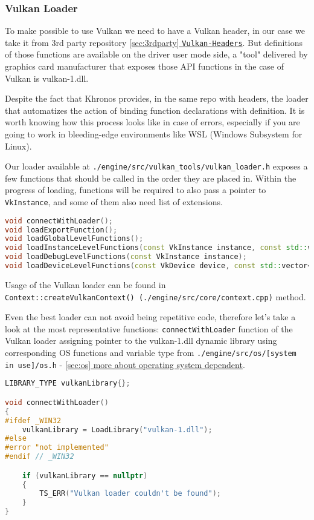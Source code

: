 \newpage
\subsubsection{Vulkan Loader}
\label{sec:vkLoader}
\hspace{\parindent}
To make possible to use Vulkan we need to have a Vulkan header, in our case we take it from 3rd party repository  \hyperref[sec:3rdparty]{\ref*{sec:3rdparty} \texttt{Vulkan-Headers}}. But definitions of those functions are available on the driver user mode side, a "tool" delivered by graphics card manufacturer that exposes those API functions in the case of Vulkan is vulkan-1.dll.

Despite the fact that Khronos provides, in the same repo with headers, the loader that automatizes the action of binding function declarations with definition. It is worth knowing how this process looks like in case of errors, especially if you are going to work in bleeding-edge environments like WSL (Windows Subsystem for Linux).

Our loader available at \texttt{./engine/src/vulkan\_tools/vulkan\_loader.h} exposes a few functions that should be called in the order they are placed in. Within the progress of loading, functions will be required to also pass a pointer to \texttt{VkInstance}, and some of them also need list of extensions.
\begin{lstlisting}[language=c++, caption=Vulkan loader header (./engine/src/vulkan\_tools/vulkan\_loader.h)]
void connectWithLoader();
void loadExportFunction();
void loadGlobalLevelFunctions();
void loadInstanceLevelFunctions(const VkInstance instance, const std::vector<std::string>& vulkanInstanceExtensions);
void loadDebugLevelFunctions(const VkInstance instance);
void loadDeviceLevelFunctions(const VkDevice device, const std::vector<std::string>& enabledVulkanDeviceExtensions);
\end{lstlisting}

Usage of the Vulkan loader can be found in \\
\texttt{Context::createVulkanContext() (./engine/src/core/context.cpp)} method.

Even the best loader can not avoid being repetitive code, therefore let's take a look at the most representative functions:
\texttt{connectWithLoader} function of the Vulkan loader assigning pointer to the vulkan-1.dll dynamic library using corresponding OS functions and variable type from \texttt{./engine/src/os/[system in use]/os.h} -  \hyperref[sec:os]{\ref*{sec:os} more about operating system dependent}.
\begin{lstlisting}[language=c++, caption=Connecting with the Vulkan-1.dll (./engine/src/vulkan\_tools/vulkan\_loader.cpp)]
LIBRARY_TYPE vulkanLibrary{};

void connectWithLoader()
{
#ifdef _WIN32
    vulkanLibrary = LoadLibrary("vulkan-1.dll");
#else
#error "not implemented"
#endif // _WIN32

    if (vulkanLibrary == nullptr)
    {
        TS_ERR("Vulkan loader couldn't be found");
    }
}
\end{lstlisting}

